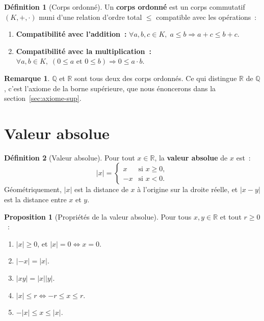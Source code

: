 \documentclass[12pt,a4paper,openany]{book}
\theoremstyle{definition}
\newtheorem{definition}{Définition}[chapter]
\newtheorem{proposition}{Proposition}[chapter]
\newtheorem{remarque}{Remarque}[chapter]
\newcommand{\Q}{\mathbb{Q}}
\newcommand{\R}{\mathbb{R}}
\newcommand{\abs}[1]{\left\lvert #1 \right\rvert}
\begin{document}
\begin{definition}[Corps ordonné]\label{def:corps-ordonne}
  Un \textbf{corps ordonné} est un corps commutatif $(K, +, \cdot)$ muni d'une relation d'ordre total $\leq$ compatible avec les opérations~:
  \begin{enumerate}[label=(O\arabic*)]
    \item \textbf{Compatibilité avec l'addition~:} $\forall a,b,c \in K,\; a \leq b \Rightarrow a + c \leq b + c$.
    \item \textbf{Compatibilité avec la multiplication~:} $\forall a,b \in K,\; (0 \leq a \text{ et } 0 \leq b) \Rightarrow 0 \leq a \cdot b$.
  \end{enumerate}
\end{definition}

\begin{remarque}\label{rem:Q-et-R-corps}
  $\Q$ et $\R$ sont tous deux des corps ordonnés. Ce qui distingue $\R$ de $\Q$, c'est l'axiome de la borne supérieure, que nous énoncerons dans la section~\ref{sec:axiome-sup}.
\end{remarque}


\section{Valeur absolue}
\label{sec:valeur-absolue}

\begin{definition}[Valeur absolue]\label{def:val-abs}
  Pour tout $x \in \R$, la \textbf{valeur absolue} de $x$ est~:
  \[
    \abs{x} = \begin{cases} x & \text{si } x \geq 0, \\ -x & \text{si } x < 0. \end{cases}
  \]
  Géométriquement, $\abs{x}$ est la distance de $x$ à l'origine sur la droite réelle, et $\abs{x - y}$ est la distance entre $x$ et $y$.
\end{definition}

\begin{proposition}[Propriétés de la valeur absolue]\label{prop:prop-val-abs}
  Pour tous $x, y \in \R$ et tout $r \geq 0$~:
  \begin{enumerate}[label=(\roman*)]
    \item $\abs{x} \geq 0$, et $\abs{x} = 0 \Leftrightarrow x = 0$.
    \item $\abs{-x} = \abs{x}$.
    \item $\abs{xy} = \abs{x}\abs{y}$.
    \item $\abs{x} \leq r \Leftrightarrow -r \leq x \leq r$.
    \item $-\abs{x} \leq x \leq \abs{x}$.
  \end{enumerate}
\end{proposition}
\end{document}
